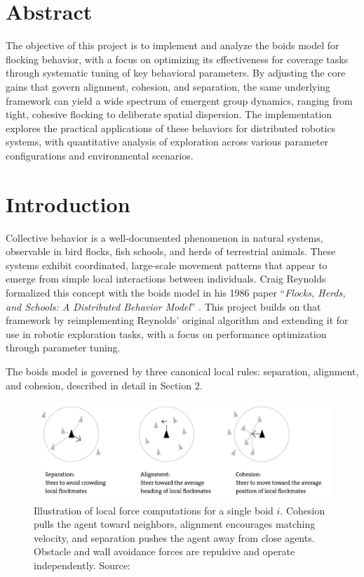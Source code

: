 \documentclass[12pt]{article}
\begin{document}
\setlength{\parindent}{0pt}
\setlength{\parskip}{0.25em}
\section*{Abstract}

The objective of this project is to implement and analyze the boids model for flocking behavior, with a focus on optimizing its effectiveness for coverage tasks through systematic tuning of key behavioral parameters. By adjusting the core gains that govern alignment, cohesion, and separation, the same underlying framework can yield a wide spectrum of emergent group dynamics, ranging from tight, cohesive flocking to deliberate spatial dispersion. The implementation explores the practical applications of these behaviors for distributed robotics systems, with quantitative analysis of exploration across various parameter configurations and environmental scenarios.

\section{Introduction}

Collective behavior is a well-documented phenomenon in natural systems, observable in bird flocks, fish schools, and herds of terrestrial animals. These systems exhibit coordinated, large-scale movement patterns that appear to emerge from simple local interactions between individuals. Craig Reynolds formalized this concept with the boids model in his 1986 paper ``\emph{Flocks, Herds, and Schools: A Distributed Behavior Model}'' \cite{reynolds1987flocks}. This project builds on that framework by reimplementing Reynolds' original algorithm and extending it for use in robotic exploration tasks, with a focus on performance optimization through parameter tuning.

The boids model is governed by three canonical local rules: separation, alignment, and cohesion, described in detail in Section 2.

\begin{figure}[h!]
    \centering
    \includegraphics[width=0.7\linewidth]{force_diagram.png}
    \caption{Illustration of local force computations for a single boid \(i\). Cohesion pulls the agent toward neighbors, alignment encourages matching velocity, and separation pushes the agent away from close agents. Obstacle and wall avoidance forces are repulsive and operate independently. Source: \cite{martinez2023boids}}
    \label{fig:force_diagram}
  \end{figure}
\end{document}
